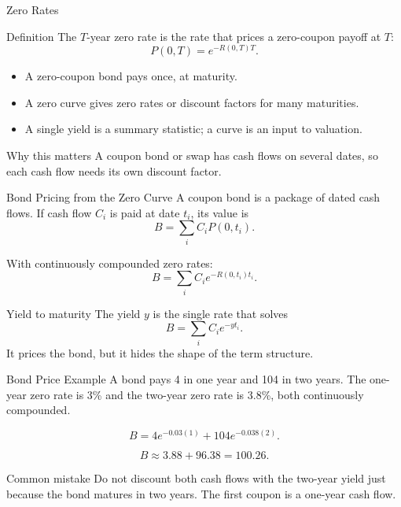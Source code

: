 \documentclass[aspectratio=169,11pt]{beamer}
\begin{document}
\begin{frame}{Zero Rates}
    \begin{block}{Definition}
        The \(T\)-year zero rate is the rate that prices a zero-coupon payoff at \(T\):
        \[
            P(0,T)=e^{-R(0,T)T}.
        \]
    \end{block}

    \begin{itemize}
        \item A zero-coupon bond pays once, at maturity.
        \item A zero curve gives zero rates or discount factors for many maturities.
        \item A single yield is a summary statistic; a curve is an input to valuation.
    \end{itemize}

    \begin{alertblock}{Why this matters}
        A coupon bond or swap has cash flows on several dates, so each cash flow needs its own discount factor.
    \end{alertblock}
\end{frame}

\begin{frame}{Bond Pricing from the Zero Curve}
    A coupon bond is a package of dated cash flows.
    If cash flow \(C_i\) is paid at date \(t_i\), its value is
    \[
        B=\sum_i C_i P(0,t_i).
    \]

    With continuously compounded zero rates:
    \[
        B=\sum_i C_i e^{-R(0,t_i)t_i}.
    \]

    \begin{block}{Yield to maturity}
        The yield \(y\) is the single rate that solves
        \[
            B=\sum_i C_i e^{-y t_i}.
        \]
        It prices the bond, but it hides the shape of the term structure.
    \end{block}
\end{frame}

\begin{frame}{Bond Price Example}
    A bond pays 4 in one year and 104 in two years.
    The one-year zero rate is 3\% and the two-year zero rate is 3.8\%, both continuously compounded.

    \[
        B=4e^{-0.03(1)}+104e^{-0.038(2)}.
    \]

    \[
        B\approx 3.88+96.38=100.26.
    \]

    \begin{alertblock}{Common mistake}
        Do not discount both cash flows with the two-year yield just because the bond matures in two years.
        The first coupon is a one-year cash flow.
    \end{alertblock}
\end{frame}
\end{document}
